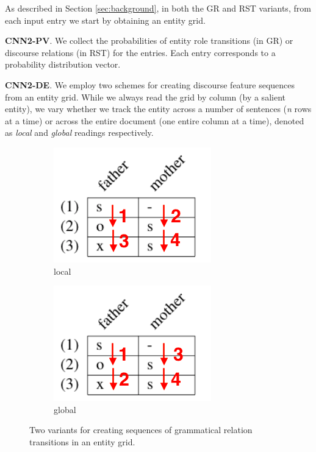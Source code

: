 As described in Section \ref{sec:background}, in both the GR and RST variants, from each input entry we start by obtaining an entity grid.
\medskip

\noindent
\textbf{CNN2-PV}.
We collect the probabilities of entity role transitions (in GR) or discourse relations (in RST) for the entries. Each entry corresponds to a probability distribution vector. 
\medskip

\noindent
\textbf{CNN2-DE}.
We employ two schemes for creating discourse feature sequences from an entity grid. While we always read the grid by column (by a salient entity), we vary whether we track the entity across a  number of sentences (\textit{n} rows at a time) or across the entire document (one entire column at a time), denoted as \emph{local} and \emph{global} readings
respectively.

\begin{figure}[t]
\centering
\begin{subfigure}{.5\textwidth}
  \centering
  \includegraphics[scale=0.4]{plots/longer2_local.png}
  \caption{local}
\end{subfigure}%
\begin{subfigure}{.5\textwidth}
  \centering
  \includegraphics[scale=0.4]{plots/longer2_global.png}
  \caption{global}
\end{subfigure}
\caption{Two variants for creating sequences of grammatical relation transitions in an entity grid.}
\label{fig:globalLocal}
\end{figure}


